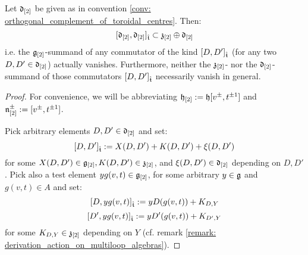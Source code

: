        \begin{proposition} \label{prop: lie_bracket_on_orthogonal_complement_of_toroidal_centre}
            Let $\mathfrak{d}_{[2]}$ be given as in convention \ref{conv: orthogonal_complement_of_toroidal_centres}. Then:
                $$[ \mathfrak{d}_{[2]}, \mathfrak{d}_{[2]} ]_{\hat{\mathfrak{t}}} \subset \mathfrak{z}_{[2]} \oplus \mathfrak{d}_{[2]}$$
            i.e. the $\mathfrak{g}_{[2]}$-summand of any commutator of the kind $[D, D']_{\hat{\mathfrak{t}}}$ (for any two $D, D' \in \mathfrak{d}_{[2]}$) actually vanishes. Furthermore, neither the $\mathfrak{z}_{[2]}$- nor the $\mathfrak{d}_{[2]}$-summand of those commutators $[D, D']_{\hat{\mathfrak{t}}}$ necessarily vanish in general. 
        \end{proposition}
            \begin{proof}
                For convenience, we will be abbreviating $\mathfrak{h}_{[2]} := \mathfrak{h}[v^{\pm}, t^{\pm 1}]$ and $\mathfrak{n}^{\pm}_{[2]} := [v^{\pm}, t^{\pm 1}]$.
            
                Pick arbitrary elements $D, D' \in \mathfrak{d}_{[2]}$ and set:
                    $$[D, D']_{\hat{\mathfrak{t}}} := X(D, D') + K(D, D') + \xi(D, D')$$
                for some $X(D, D') \in \mathfrak{g}_{[2]}, K(D, D') \in \mathfrak{z}_{[2]}$, and $\xi(D, D') \in \mathfrak{d}_{[2]}$ depending on $D, D'$. Pick also a test element $y g(v, t) \in \mathfrak{g}_{[2]}$, for some arbitrary $y \in \mathfrak{g}$ and $g(v, t) \in A$ and set:
                    $$[D, y g(v, t)]_{\hat{\mathfrak{t}}} := y D( g(v, t) ) + K_{D, Y}$$
                    $$[D', y g(v, t)]_{\hat{\mathfrak{t}}} := y D'( g(v, t) ) + K_{D', Y}$$
                for some $K_{D, Y} \in \mathfrak{z}_{[2]}$ depending on $Y$ (cf. remark \ref{remark: derivation_action_on_multiloop_algebras}).
                

\end{proof}

